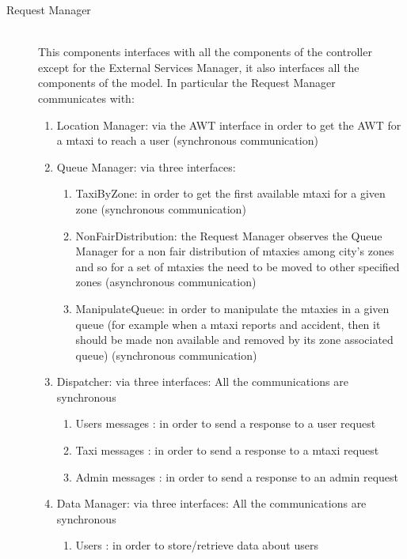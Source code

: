 \documentclass[11pt,titlepage]{article} %
\begin{document}
\begin{description}
      \item [Request Manager] \hfill \\
          This components interfaces with all the components of the controller except for the External Services Manager, it also interfaces
          all the components of the model.
          In particular the Request Manager communicates with:
	\begin{enumerate}
	            \item Location Manager: via the AWT interface in order to get the AWT for a mtaxi to reach a user
	            (synchronous communication)
	            \item Queue Manager: via three interfaces:
		 \begin{enumerate}
		                \item TaxiByZone: in order to get the first available mtaxi for a given zone
		                (synchronous communication)
		                \item NonFairDistribution: the Request Manager observes the Queue Manager for a non fair distribution of mtaxies among city's zones and so for a set of mtaxies
		                the need to be moved to other specified zones
		                (asynchronous communication)
		                \item ManipulateQueue: in order to manipulate the mtaxies in a given queue (for example when a mtaxi reports and accident, then it should be
		                made non available and removed by its zone associated queue)
		                (synchronous communication)
		\end{enumerate}
	          \item Dispatcher: via three interfaces:\newline
		All the communications are synchronous
		\begin{enumerate}
	                \item Users messages : in order to send a response to a user request
	                \item Taxi messages : in order to send a response to a mtaxi request
	                \item Admin messages : in order to send a response to an admin request
		\end{enumerate}
	          \item Data Manager: via three interfaces:\newline
		All the communications are synchronous
		\begin{enumerate}
	               \item Users : in order to store/retrieve data about users

\end{enumerate}
\end{enumerate}
\end{description}
\end{document}
